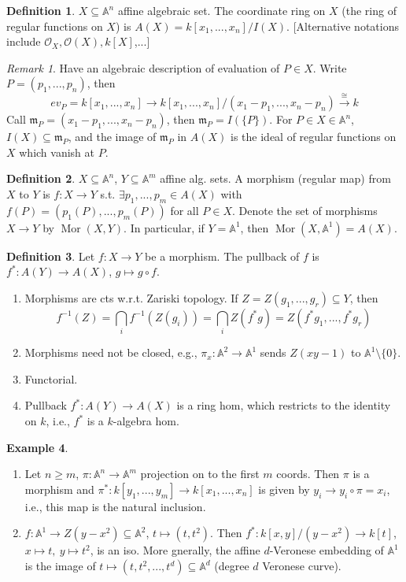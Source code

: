 \documentclass{article}
\theoremstyle{definition}
\newtheorem{defn}{Definition}[section]
\newtheorem{example}[defn]{Example}
\theoremstyle{remark}
\newtheorem{rem}{Remark}
\theoremstyle{plain}
\newcommand{\bA}{\mathbb{A}}
\begin{document}
\begin{defn}
    $X\subseteq\bA^n$ affine algebraic set. The coordinate ring on $X$ (the ring of regular functions on $X$) is $A(X)=k[x_1,...,x_n]/I(X)$. [Alternative notations include $\mathcal O_X,\mathcal O(X), k[X]$,...]
\end{defn}
\begin{rem}
    Have an algebraic description of evaluation of $P\in X$. Write $P=(p_1,...,p_n)$, then
    \[ev_P=k[x_1,...,x_n]\to k[x_1,...,x_n]/(x_1-p_1,...,x_n-p_n)\overset\cong\to k\]
    Call $\mathfrak m_P=(x_1-p_1,...,x_n-p_n)$, then $\mathfrak m_P=I(\{P\})$. For $P\in X\in\bA^n$, $I(X)\subseteq\mathfrak m_P$, and the image of $\mathfrak m_P$ in $A(X)$ is the ideal of regular functions on $X$ which vanish at $P$.
\end{rem}
\begin{defn}
    $X\subseteq \bA^n$, $Y\subseteq\bA^m$ affine alg. sets. A morphism (regular map) from $X$ to $Y$ is $f:X\to Y$ s.t. $\exists p_1,...,p_m\in A(X)$ with $f(P)=(p_1(P),...,p_m(P))$ for all $P\in X$. Denote the set of morphisms $X\to Y$ by $\operatorname{Mor}(X,Y)$. In particular, if $Y=\bA^1$, then $\operatorname{Mor}(X,\bA^1)=A(X)$.
\end{defn}
\begin{defn}
    Let $f:X\to Y$ be a morphism. The pullback of $f$ is $f^\ast:A(Y)\to A(X)$, $g\mapsto g\circ f$. 
\end{defn}
\begin{enumerate}[1)]
    \item Morphisms are cts w.r.t. Zariski topology. If $Z=Z(g_1,...,g_r)\subseteq Y$, then
    \[f^{-1}(Z)=\bigcap_i f^{-1}(Z(g_i))=\bigcap_i Z(f^\ast g)=Z(f^\ast g_1,...,f^\ast g_r)\]
    \item Morphisms need not be closed, e.g., $\pi_x:\bA^2\to\bA^1$ sends $Z(xy-1)$ to $\bA^1\setminus\{0\}$.
    \item Functorial.
    \item Pullback $f^\ast:A(Y)\to A(X)$ is a ring hom, which restricts to the identity on $k$, i.e., $f^\ast$ is a $k$-algebra hom.
\end{enumerate}
\begin{example}
\begin{enumerate}[1)]
    \item Let $n\ge m$, $\pi:\bA^n\to\bA^m$ projection on to the first $m$ coords. Then $\pi$ is a morphism and $\pi^\ast:k[y_1,...,y_m]\to k[x_1,...,x_n]$ is given by $y_i\to y_i\circ \pi=x_i$, i.e., this map is the natural inclusion.
    \item $f:\bA^1\to Z(y-x^2)\subseteq\bA^2$, $t\mapsto (t,t^2)$. Then $f^\ast:k[x,y]/(y-x^2)\to k[t]$, $x\mapsto t,\ y\mapsto t^2$, is an iso. More gnerally, the affine $d$-Veronese embedding of $\bA^1$ is the image of $t\mapsto (t,t^2,...,t^d)\subseteq\bA^d$ (degree $d$ Veronese curve).
\end{enumerate}
\end{example}
\end{document}
